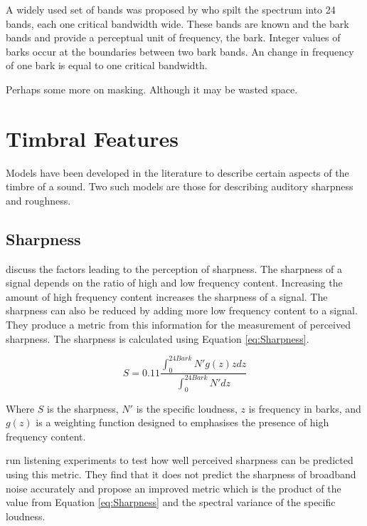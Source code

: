 		A widely used set of bands was proposed by \citet{zwicker1961subdivision} who spilt the spectrum into 24
		bands, each one critical bandwidth wide. These bands are known and the bark bands and provide a perceptual
		unit of frequency, the bark. Integer values of barks occur at the boundaries between two bark bands. An
		change in frequency of one bark is equal to one critical bandwidth.

	\note
	{
		Perhaps some more on masking. Although it may be wasted space.
	}

\section{Timbral Features}
\label{sec:Timbre-TimbralFeatures}
	Models have been developed in the literature to describe certain aspects of the timbre of a sound. Two such models
	are those for describing auditory sharpness and roughness.
	
	\subsection{Sharpness}
	\label{sec:Timbre-TimbralFeatures-Sharpness}
		\citet{fastl2007psychoacoustics} discuss the factors leading to the perception of sharpness. The sharpness
		of a signal depends on the ratio of high and low frequency content. Increasing the amount of high frequency
		content increases the sharpness of a signal. The sharpness can also be reduced by adding more low frequency
		content to a signal. They produce a metric from this information for the measurement of perceived sharpness.
		The sharpness is calculated using Equation \ref{eq:Sharpness}.

		\begin{equation}
			S = 0.11\frac{\int_{0}^{24Bark} N'g(z)zdz}{\int_{0}^{24Bark}N'dz}
			\label{eq:Sharpness}
		\end{equation}

		Where $S$ is the sharpness, $N'$ is the specific loudness, $z$ is frequency in barks, and $g(z)$ is a
		weighting function designed to emphasises the presence of high frequency content.

		\citet{marui2006predicting} run listening experiments to test how well perceived sharpness can be predicted
		using this metric. They find that it does not predict the sharpness of broadband noise accurately and
		propose an improved metric which is the product of the value from Equation \ref{eq:Sharpness} and the
		spectral variance of the specific loudness.

